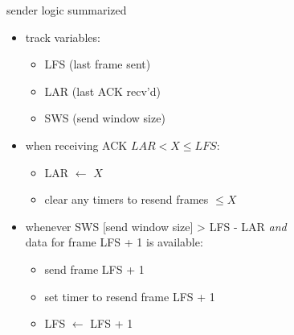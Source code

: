 \begin{frame}{sender logic summarized}
\begin{itemize}
\item track variables:
    \begin{itemize}
    \item LFS (last frame sent)
    \item LAR (last ACK recv'd)
    \item SWS (send window size)
    \end{itemize}
\item when receiving ACK $LAR < X \le LFS$:
    \begin{itemize}
    \item LAR $\leftarrow$ $X$
    \item clear any timers to resend frames $\le X$
    \end{itemize}
\item whenever SWS [send window size] > LFS - LAR \textit{and} \\
    data for frame LFS + 1 is available:
    \begin{itemize}
    \item send frame LFS + 1
    \item set timer to resend frame LFS + 1
    \item LFS $\leftarrow$ LFS + 1
    \end{itemize}
\end{itemize}
\end{frame}
